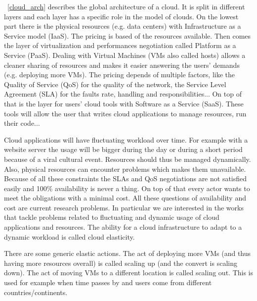 \documentclass[a4paper, onecolumn]{article}
\begin{document}
  \figurename~\ref{cloud_arch} describes the global architecture of a cloud. It
  is split in different layers and each layer has a specific role in the model
  of clouds. On the lowest part there is the physical resources (e.g. data
  centers) with Infrastructure as a Service model (IaaS). The pricing is based
  of the resources available. Then comes the layer of virtualization and
  performances negotiation called Platform as a Service (PaaS). Dealing with
  Virtual Machines (VMs also called hosts) allows a cleaner sharing of resources
  and makes it easier answering the users' demands (e.g. deploying more VMs).
  The pricing depends of multiple factors, like the Quality of Service (QoS) for
  the quality of the network, the Service Level Agreement (SLA) for the faults
  rate, handling and responsibilities... On top of that is the layer for users'
  cloud tools with Software as a Service (SaaS). These tools will allow the user
  that writes cloud applications to manage resources, run their code...
  
  Cloud applications will have fluctuating workload over time. For example 
  with a website server the usage will be bigger during the day or during a 
  short period because of a viral cultural event. Resources should thus be 
  managed dynamically. Also, physical resources can encounter problems which 
  makes them unavailable. Because of all these constraints the SLAs and QoS 
  negotiations are not satisfied easily and 100\% availability is never a 
  thing. 
  On top of that every actor wants to meet the obligations with a minimal cost. 
  All these questions of availability and cost are current research problems. 
  In particular we are interested in the works that tackle problems related to 
  fluctuating and dynamic usage of cloud applications and resources. The 
  ability for a cloud infrastructure to adapt to a dynamic workload is called 
  cloud elasticity.
  
  
  There are some generic elastic actions. The act of deploying more VMs (and
  thus having more resources overall) is called scaling up (and the convert is
  scaling down). The act of moving VMs to a different location is called scaling
  out. This is used for example when time passes by and users come from
  different countries/continents.
  
  
\end{document}
